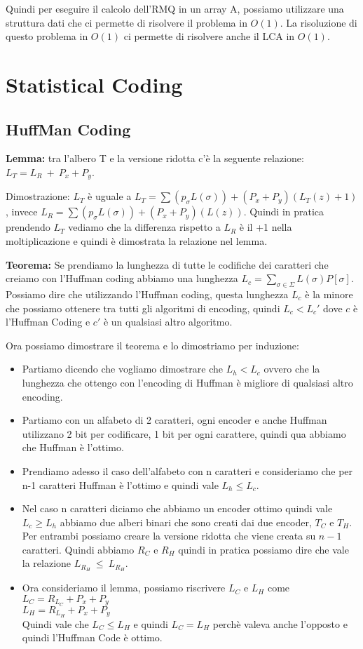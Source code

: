 \documentclass[12pt]{article}
\begin{document}
Quindi per eseguire il calcolo dell'RMQ in un array A, possiamo utilizzare una struttura dati che ci permette di risolvere il problema in $O(1)$. La risoluzione di questo problema in $O(1)$ ci permette di risolvere anche il LCA in $O(1)$.



\section{Statistical Coding}

\subsection{HuffMan Coding}

\textbf{Lemma:} tra l'albero T e la versione ridotta c'è la seguente relazione: $L_T = L_R\ + \ P_x + P_y$.

Dimostrazione: $L_T$ è uguale a $L_T=\sum(p_\sigma L(\sigma))+(P_x+P_y)(L_T(z)+1)$, invece $L_R=\sum(p_\sigma L(\sigma))+(P_x+P_y)(L(z))$. Quindi in pratica prendendo $L_T$ vediamo che la differenza rispetto a $L_R$ è il +1 nella moltiplicazione e quindi è dimostrata la relazione nel lemma.


\textbf{Teorema:} Se prendiamo la lunghezza di tutte le codifiche dei caratteri che creiamo con l'Huffman coding abbiamo una lunghezza $L_c=\sum_{\sigma \in \Sigma} L(\sigma)P[\sigma]$.
Possiamo dire che utilizzando l'Huffman coding, questa lunghezza $L_c$ è la minore che possiamo ottenere tra tutti gli algoritmi di encoding, quindi $L_c<L_c'$ dove $c$ è l'Huffman Coding e $c'$ è un qualsiasi altro algoritmo.


Ora possiamo dimostrare il teorema e lo dimostriamo per induzione:

\begin{itemize}
\item Partiamo dicendo che vogliamo dimostrare che $L_h<L_c$ ovvero che la lunghezza che ottengo con l'encoding di Huffman è migliore di qualsiasi altro encoding. 
\item Partiamo con un alfabeto di 2 caratteri, ogni encoder e anche Huffman utilizzano 2 bit per codificare, 1 bit per ogni carattere, quindi qua abbiamo che Huffman è l'ottimo.
\item Prendiamo adesso il caso dell'alfabeto con n caratteri e consideriamo che per n-1 caratteri Huffman è l'ottimo e quindi vale $L_h \leq L_c$.
\item Nel caso n caratteri diciamo che abbiamo un encoder ottimo quindi vale $L_c \geq L_h$ abbiamo due alberi binari che sono creati dai due encoder, $T_C$ e $T_H$. Per entrambi possiamo creare la versione ridotta che viene creata su $n-1$ caratteri. Quindi abbiamo $R_C$ e $R_H$ quindi in pratica possiamo dire che vale la relazione $L_{R_H}\ \leq \ L_{R_H}$.
\item Ora consideriamo il lemma, possiamo riscrivere $L_C$ e $L_H$ come \\ 
$L_C=R_{L_C}+P_x+P_y$ \\
$L_H=R_{L_H}+P_x+P_y$ \\
Quindi vale che $L_C \leq L_H$ e quindi $L_C = L_H$ perchè valeva anche l'opposto e quindi l'Huffman Code è ottimo. 
\end{itemize}
\end{document}
